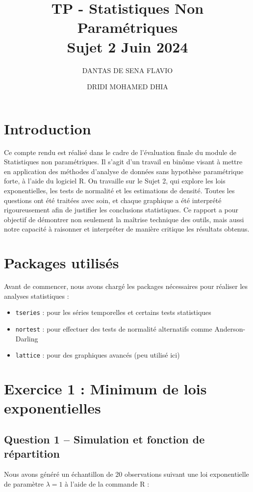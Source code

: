 \documentclass[a4paper,11pt]{article}
\title{TP - Statistiques Non Paramétriques \\ \smallskip \large Sujet 2 \textendash{} Juin 2024}
\author{DANTAS DE SENA FLAVIO \and DRIDI MOHAMED DHIA}
\date{}
\begin{document}
\maketitle

\section*{Introduction}
Ce compte rendu est réalisé dans le cadre de l’évaluation finale du module de Statistiques non paramétriques. Il s’agit d’un travail en binôme visant à mettre en application des méthodes d’analyse de données sans hypothèse paramétrique forte, à l’aide du logiciel R. On travaille sur le Sujet 2, qui explore les lois exponentielles, les tests de normalité et les estimations de densité. Toutes les questions ont été traitées avec soin, et chaque graphique a été interprété rigoureusement afin de justifier les conclusions statistiques. Ce rapport a pour objectif de démontrer non seulement la maîtrise technique des outils, mais aussi notre capacité à raisonner et interpréter de manière critique les résultats obtenus.

\section*{Packages utilisés}
Avant de commencer, nous avons chargé les packages nécessaires pour réaliser les analyses statistiques :
\begin{itemize}
    \item \texttt{tseries} : pour les séries temporelles et certains tests statistiques
    \item \texttt{nortest} : pour effectuer des tests de normalité alternatifs comme Anderson-Darling
    \item \texttt{lattice} : pour des graphiques avancés (peu utilisé ici)
\end{itemize}


\newpage

\section*{Exercice 1 : Minimum de lois exponentielles}

\subsection*{Question 1 – Simulation et fonction de répartition}
Nous avons généré un échantillon de 20 observations suivant une loi exponentielle de paramètre $\lambda = 1$ à l’aide de la commande R :
\end{document}
